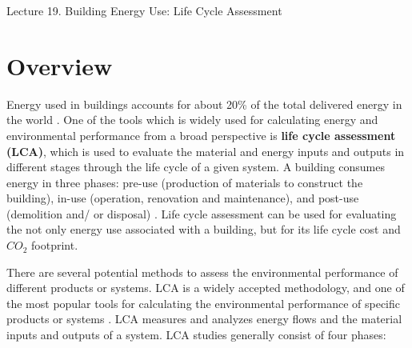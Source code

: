 \documentclass[10pt]{article}
\begin{document}
   \noindent
   \begin{center}

   \hrulefill
   
   \vspace{5pt}
   
   \vspace{0pt}
   
   {\Large \hfill  Lecture 19.  Building Energy Use: Life Cycle Assessment}
   \vspace{5pt}



   \hrulefill
   \end{center}

{}


\section{Overview} %
Energy used in buildings accounts for about 20\%  of the total delivered energy in the world \cite{ODE2016}. One of the tools which is widely used for calculating energy and environmental performance from a broad perspective is \textbf{life cycle assessment (LCA)}, which is used to evaluate the material and energy inputs and outputs in different stages through the life cycle of a given system. {\color{blue}A building consumes energy in three phases: pre-use (production of materials to construct the building), in-use (operation, renovation and maintenance), and post-use (demolition and/ or disposal)} \cite{cabeza2014life}. Life cycle assessment can be used for evaluating the not only energy use associated with a building, but for its life cycle cost and $CO_2$ footprint. 

There are several potential methods to assess the environmental performance of different products or systems. %
LCA is a widely accepted methodology, and one of the most popular tools for calculating the environmental performance of specific products or systems \cite{crawford2003validation}. LCA measures and analyzes energy flows and the material inputs and outputs of a system.
 LCA studies generally consist of four phases: 
 \cite{International_Organization_for_Standardization2006-gc}  
 
\end{document}
